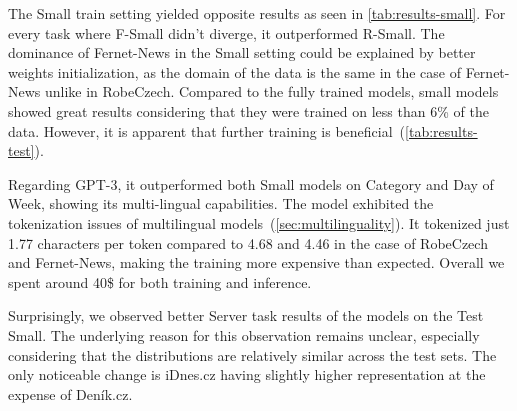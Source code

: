The Small train setting yielded opposite results as seen in \autoref{tab:results-small}.
For every task where F-Small didn't diverge, it outperformed R-Small.
The dominance of Fernet-News in the Small setting could be explained by
better weights initialization, as the domain of the data is the same
in the case of Fernet-News unlike in RobeCzech. Compared to the fully
trained models, small models showed great results considering that they were trained on less than 6\% of the data.
However, it is apparent that further training is beneficial~(\autoref{tab:results-test}).

Regarding GPT-3, it outperformed both Small models on Category and Day of Week, showing its multi-lingual capabilities.
The model exhibited the tokenization issues of multilingual models~(\autoref{sec:multilinguality}).
It tokenized just 1.77 characters per token compared to
4.68 and 4.46 in the case of RobeCzech and Fernet-News, making the training more expensive than expected.
Overall we spent around 40\$ for both training and inference.

Surprisingly, we observed better Server task results of the models on the Test Small.
The underlying reason for this observation remains unclear, especially considering
that the distributions are relatively similar across the test sets. The only
noticeable change is iDnes.cz having slightly higher representation at the expense
of Deník.cz.



